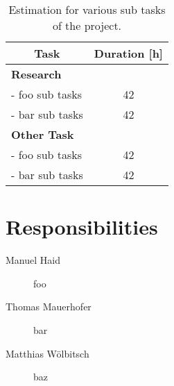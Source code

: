 \documentclass[12pt, a4paper]{article}
\begin{document}
\begin{table}[h!]
\centering
\begin{tabular}{|l|c|}
\hline
\multicolumn{1}{|c|}{\textbf{Task}} & \textbf{Duration [h]} \\ \hline
\textbf{Research} &  \\ \hline
  - foo sub tasks & 42 \\ \hline
  - bar sub tasks & 42 \\ \hline
\textbf{Other Task} &  \\ \hline
  - foo sub tasks & 42 \\ \hline
  - bar sub tasks & 42 \\ \hline
\end{tabular}
\caption{Estimation for various sub tasks of the project.}
\label{tab:timetable}
\end{table}


\section{Responsibilities}

\begin{description}
 \item[Manuel Haid] foo
 \item[Thomas Mauerhofer] bar
 \item[Matthias Wölbitsch] baz
\end{description}
\end{document}
